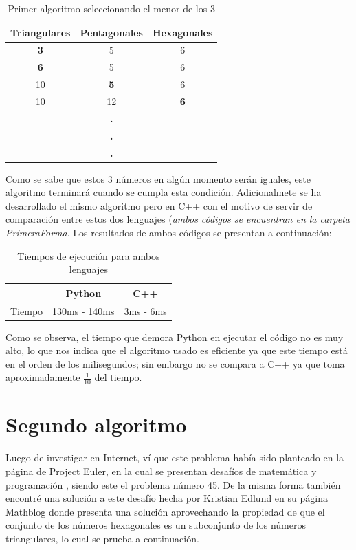 \documentclass[12pt, twoclumn]{article}
\begin{document}
\begin{table}[H]
   \centering
   \begin{tabular}{ccc}
      Triangulares & Pentagonales & Hexagonales\\
      \hline
      {\textbf 3} & 5 & 6\\
      {\textbf 6} & 5 & 6\\
      10 & {\textbf 5} & 6\\
      10 & 12 & {\textbf 6}\\
      & {\textbf .} &\\
      & {\textbf .} &\\
      & {\textbf .} &\\
   \end{tabular}
   \caption{Primer algoritmo seleccionando el menor de los 3}
\end{table}

Como se sabe que estos 3 números en algún momento serán iguales, este algoritmo terminará cuando se cumpla esta condición.
Adicionalmete se ha desarrollado el mismo algoritmo pero en C++ con el motivo de servir de comparación entre estos dos
lenguajes (\textit{ambos códigos se encuentran en la carpeta PrimeraForma}. Los resultados de ambos códigos se presentan
a continuación:

\begin{table}[H]
   \centering
   \caption{Tiempos de ejecución para ambos lenguajes}
   \begin{tabular}{ccc}
      & Python & C++\\
      \hline
      Tiempo & 130ms - 140ms & 3ms - 6ms\\
   \end{tabular}
\end{table}

Como se observa, el tiempo que demora Python en ejecutar el código no es muy alto, lo que nos indica que el algoritmo usado
es eficiente ya que este tiempo está en el orden de los milisegundos; sin embargo no se compara a C++ ya que toma aproximadamente $ \frac{1}{10} $ del tiempo.

\section{Segundo algoritmo}
Luego de investigar en Internet, ví que este problema había sido planteado en la página de Project Euler, en la cual se
presentan desafíos de matemática y programación \cite{peuler}, siendo este el problema número 45. De la misma forma también
encontré una solución a este desafío hecha por Kristian Edlund en su página Mathblog \cite{kris} donde presenta una solución
aprovechando la propiedad de que el conjunto de los números hexagonales es un subconjunto de los números triangulares, lo cual
se prueba a continuación.
\end{document}
